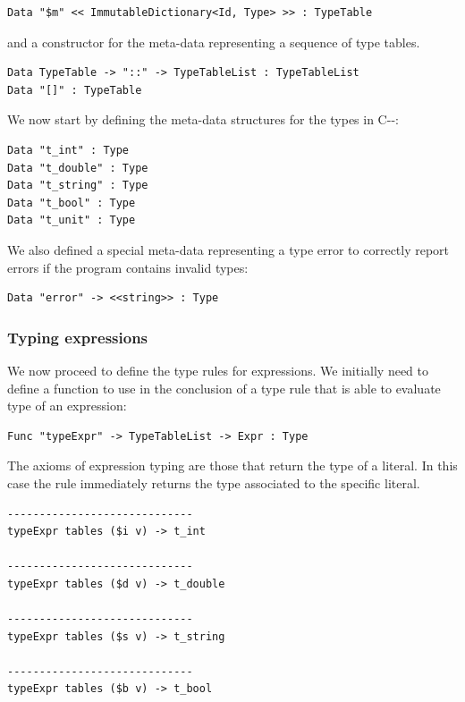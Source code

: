 \begin{lstlisting}
Data "$m" << ImmutableDictionary<Id, Type> >> : TypeTable 
\end{lstlisting}

\noindent
and a constructor for the meta-data representing a sequence of type tables.

\begin{lstlisting}
Data TypeTable -> "::" -> TypeTableList : TypeTableList
Data "[]" : TypeTable
\end{lstlisting}

\noindent
We now start by defining the meta-data structures for the types in C-{}-:

\begin{lstlisting}
Data "t_int" : Type
Data "t_double" : Type
Data "t_string" : Type
Data "t_bool" : Type
Data "t_unit" : Type
\end{lstlisting}

\noindent
We also defined a special meta-data representing a type error to correctly report errors if the program contains invalid types:

\begin{lstlisting}
Data "error" -> <<string>> : Type
\end{lstlisting}

\subsubsection{Typing expressions}

We now proceed to define the type rules for expressions. We initially need to define a function to use in the conclusion of a type rule that is able to evaluate type of an expression:

\begin{lstlisting}
Func "typeExpr" -> TypeTableList -> Expr : Type
\end{lstlisting}

The axioms of expression typing are those that return the type of a literal. In this case the rule immediately returns the type associated to the specific literal.

\begin{lstlisting}
-----------------------------
typeExpr tables ($i v) -> t_int

-----------------------------
typeExpr tables ($d v) -> t_double

-----------------------------
typeExpr tables ($s v) -> t_string

-----------------------------
typeExpr tables ($b v) -> t_bool
\end{lstlisting}


